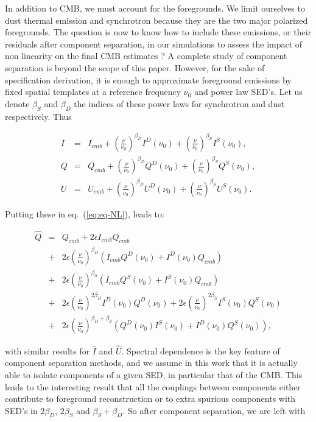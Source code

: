 In addition to CMB, we must account for the foregrounds. We limit
ourselves to dust thermal emission and synchrotron because they are the two
major polarized foregrounds. The question is now to know how to include these
emissions, or their residuals after component separation, in our simulations to
assess the impact of non linearity on the final CMB estimates ? A complete study
of component separation is beyond the scope of this paper. However, for the sake of
specification derivation, it is enough to approximate foreground emissions by
fixed spatial templates at a reference frequency $\nu_0$ and power law
SED's. Let us denote $\beta_S$ and $\beta_D$ the indices of these power laws for
synchrotron and dust respectively. Thus

\begin{eqnarray}
I&=&I_{cmb} + \left(\frac{\nu}{\nu_0}\right)^{\beta_D}I^D(\nu_0) +
\left(\frac{\nu}{\nu_0}\right)^{\beta_S}I^S(\nu_0), \\
Q&=&Q_{cmb} + \left(\frac{\nu}{\nu_0}\right)^{\beta_D}Q^D(\nu_0) +
\left(\frac{\nu}{\nu_0}\right)^{\beta_S}Q^S(\nu_0), \\
U&=&U_{cmb} + \left(\frac{\nu}{\nu_0}\right)^{\beta_D}U^D(\nu_0) +
\left(\frac{\nu}{\nu_0}\right)^{\beta_S}U^S(\nu_0).
\end{eqnarray}

Putting these in eq.~(\ref{eq:eq-NL}), leads to:

\begin{eqnarray}
\hat{Q} &=& Q_{cmb} + 2\epsilon I_{cmb}Q_{cmb} \nonumber\\
&+&
2\epsilon\left(\frac{\nu}{\nu_0}\right)^{\beta_D}\left(I_{cmb}Q^D(\nu_0)+I^D(\nu_0)Q_{cmb}\right)\nonumber\\
&+&2\epsilon\left(\frac{\nu}{\nu_0}\right)^{\beta_S}\left(I_{cmb}Q^S(\nu_0)+I^S(\nu_0)Q_{cmb}\right) \nonumber\\
&+&2\epsilon\left(\frac{\nu}{\nu_0}\right)^{2\beta_D}I^D(\nu_0)Q^D(\nu_0) +
2\epsilon\left(\frac{\nu}{\nu_0}\right)^{2\beta_S}I^S(\nu_0)Q^S(\nu_0)\nonumber\\
&+&2\epsilon\left(\frac{\nu}{\nu_0}\right)^{\beta_D+\beta_S}\left(Q^D(\nu_0)I^S(\nu_0)+I^D(\nu_0)Q^S(\nu_0)\right),
\end{eqnarray}

with similar results for $\hat{I}$ and $\hat{U}$. Spectral dependence is the key
feature of component separation methods, and we assume in this work that it is
actually able to isolate components of a given SED, in particular that of the
CMB. This leads to the interesting result that all the couplings between
components either contribute to foreground reconstruction or to extra spurious
components with SED's in $2\beta_D$, $2\beta_S$ and $\beta_S+\beta_D$. So after
component separation, we are left with

